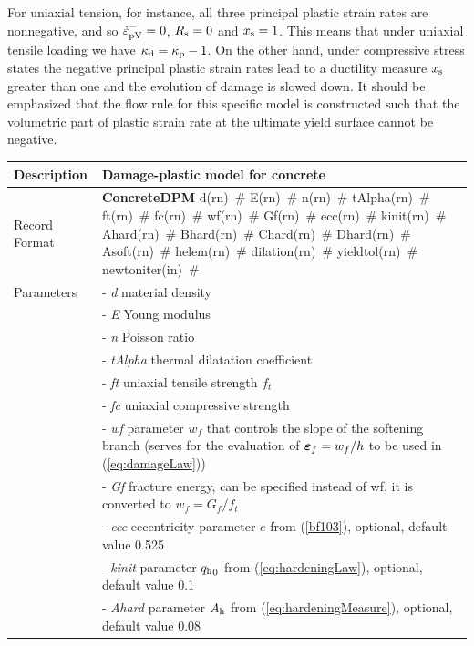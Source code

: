\documentclass[a4paper]{article}
\newcommand{\mbf}[1]{\mbox{\boldmath$#1$}}
\newcommand{\descitem}[1]{{\noindent \bf #1}}
\newcommand{\elemparam}[2]{{{#1\tiny (#2)}~\#}}
\newcommand{\param}[1]{{\it #1}}
\newcommand{\eps} {\mbf{\varepsilon}}
\begin{document}
For uniaxial tension, for instance, all three principal plastic strain rates are nonnegative, and so $\dot{\varepsilon}_{\rm pV}^{-} =0$, $R_{\rm s}=0$ and $x_{\rm s}=1$. This means that under uniaxial tensile loading we have $\kappa_{\rm d}=\kappa_{\rm p}-1$. On the other hand, under compressive stress states the negative principal plastic strain rates lead to a ductility measure $x_{\rm s}$ greater than one and the evolution of damage is slowed down. It should be emphasized that the flow rule for this specific model is constructed such that the volumetric part of plastic strain rate at the ultimate yield surface cannot be negative.

\begin{table}[!htb]
\begin{tabular}{|l|p{9cm}|}
\hline
Description & Damage-plastic model for concrete\\
\hline
Record Format & \descitem{ConcreteDPM}  \elemparam{d}{rn}
\elemparam{E}{rn} \elemparam{n}{rn} \elemparam{tAlpha}{rn}
 \elemparam{ft}{rn} \elemparam{fc}{rn} \elemparam{wf}{rn} \elemparam{Gf}{rn} \elemparam{ecc}{rn}
 \elemparam{kinit}{rn} \elemparam{Ahard}{rn} \elemparam{Bhard}{rn} \elemparam{Chard}{rn} \elemparam{Dhard}{rn} \elemparam{Asoft}{rn} \elemparam{helem}{rn} \elemparam{dilation}{rn} \elemparam{yieldtol}{rn} \elemparam{newtoniter}{in} \\
Parameters &- \param{d} material density\\
&- \param{E} Young modulus\\
&- \param{n} Poisson ratio\\
&- \param{tAlpha} thermal dilatation coefficient\\
&- \param{ft} uniaxial tensile strength $f_t$\\
&- \param{fc} uniaxial compressive strength\\
&- \param{wf} parameter $w_f$ that controls the slope of the softening branch (serves for the evaluation of $\eps_f=w_f/h$ to be used in (\ref{eq:damageLaw}))\\
&- \param{Gf} fracture energy, can be specified instead of wf, it is converted to $w_f=G_f/f_t$ \\
&- \param{ecc} eccentricity parameter $e$ from (\ref{bf103}), optional, default value 0.525\\
&- \param{kinit} parameter ${q_{\rm h}}_0$ from (\ref{eq:hardeningLaw}), optional, default value 0.1\\
&- \param{Ahard} parameter $A_{\rm h}$ from (\ref{eq:hardeningMeasure}), optional, default value 0.08\\

\end{tabular}
\end{table}
\end{document}
